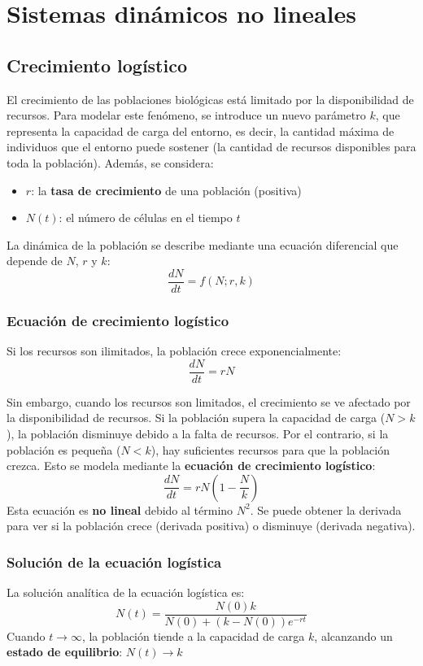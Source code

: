 \chapter{Sistemas dinámicos no lineales}
\section{Crecimiento logístico}
El crecimiento de las poblaciones biológicas está limitado por la disponibilidad de recursos. Para modelar este fenómeno, se introduce un nuevo parámetro $k$, que representa la capacidad de carga del entorno, es decir, la cantidad máxima de individuos que el entorno puede sostener (la cantidad de recursos disponibles para toda la población). Además, se considera:
\begin{itemize}
\item $r$: la \textbf{tasa de crecimiento} de una población (positiva)
\item $N(t)$: el número de células en el tiempo $t$
\end{itemize}
La dinámica de la población se describe mediante una ecuación diferencial que depende de $N$, $r$ y $k$:
$$\frac{dN}{dt} = f(N; r, k)$$

\subsection{Ecuación de crecimiento logístico}
Si los recursos son ilimitados, la población crece exponencialmente:
$$\frac{dN}{dt} = rN$$

Sin embargo, cuando los recursos son limitados, el crecimiento se ve afectado por la disponibilidad de recursos. Si la población supera la capacidad de carga ($N > k$), la población disminuye debido a la falta de recursos. Por el contrario, si la población es pequeña ($N < k$), hay suficientes recursos para que la población crezca. Esto se modela mediante la \textbf{ecuación de crecimiento logístico}:
$$\frac{dN}{dt} = rN(1-\frac{N}{k})$$
Esta ecuación es \textbf{no lineal} debido al término $N^2$. Se puede obtener la derivada para ver si la población crece (derivada positiva) o disminuye (derivada negativa).

\subsection{Solución de la ecuación logística}
La solución analítica de la ecuación logística es:
$$N(t) = \frac{N(0) k}{N(0) + (k - N(0))e^{-rt}}$$
Cuando $t \rightarrow \infty$, la población tiende a la capacidad de carga $k$, alcanzando un \textbf{estado de equilibrio}:
$N(t) \rightarrow k$

